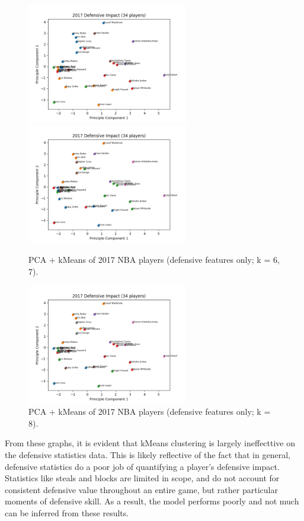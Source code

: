 \documentclass{article}
\begin{document}
\begin{figure}[h]
  \includegraphics[width=7cm]{2017_Graphs/PCA_2017_Defensive_6.png}
  \includegraphics[width=7cm]{2017_Graphs/PCA_2017_Defensive_7.png}
  \caption{PCA + kMeans of 2017 NBA players (defensive features only; k = 6, 7).}
\end{figure}

\begin{figure}[h]
  \centering
  \includegraphics[width=7cm]{2017_Graphs/PCA_2017_Defensive_8.png}
  \caption{PCA + kMeans of 2017 NBA players (defensive features only; k = 8).}
\end{figure}

From these graphs, it is evident that kMeans clustering is largely ineffecttive on the defensive statistics data. This is likely reflective of the fact that in general, defensive statistics do a poor job of quantifying a player's defensive impact. Statistics like steals and blocks are limited in scope, and do not account for consistent defensive value throughout an entire game, but rather particular moments of defensive skill. As a result, the model performs poorly and not much can be inferred from these results.
\end{document}
